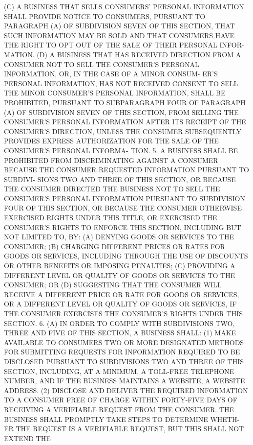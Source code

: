    (C)  A  BUSINESS  THAT  SELLS  CONSUMERS'  PERSONAL  INFORMATION SHALL
 PROVIDE NOTICE TO CONSUMERS, PURSUANT TO PARAGRAPH  (A)  OF  SUBDIVISION
 SEVEN  OF  THIS  SECTION,  THAT  SUCH  INFORMATION  MAY BE SOLD AND THAT
 CONSUMERS HAVE THE RIGHT TO OPT OUT OF THE SALE OF THEIR PERSONAL INFOR-
 MATION.
   (D) A BUSINESS THAT HAS RECEIVED DIRECTION FROM A CONSUMER NOT TO SELL
 THE  CONSUMER'S PERSONAL INFORMATION, OR, IN THE CASE OF A MINOR CONSUM-
 ER'S PERSONAL INFORMATION, HAS NOT RECEIVED CONSENT TO  SELL  THE  MINOR
 CONSUMER'S  PERSONAL  INFORMATION,  SHALL  BE  PROHIBITED,  PURSUANT  TO
 SUBPARAGRAPH FOUR OF PARAGRAPH (A) OF SUBDIVISION SEVEN OF THIS SECTION,
 FROM SELLING THE CONSUMER'S PERSONAL INFORMATION AFTER  ITS  RECEIPT  OF
 THE  CONSUMER'S  DIRECTION,  UNLESS  THE  CONSUMER SUBSEQUENTLY PROVIDES
 EXPRESS AUTHORIZATION FOR THE SALE OF THE CONSUMER'S  PERSONAL  INFORMA-
 TION.
   5.  A  BUSINESS  SHALL  BE  PROHIBITED  FROM  DISCRIMINATING AGAINST A
 CONSUMER BECAUSE THE CONSUMER REQUESTED INFORMATION PURSUANT TO SUBDIVI-
 SIONS TWO AND THREE OF THIS SECTION, OR BECAUSE  THE  CONSUMER  DIRECTED
 THE BUSINESS NOT TO SELL THE CONSUMER'S PERSONAL INFORMATION PURSUANT TO
 SUBDIVISION  FOUR  OF  THIS  SECTION,  OR BECAUSE THE CONSUMER OTHERWISE
 EXERCISED RIGHTS UNDER THIS TITLE, OR EXERCISED THE CONSUMER'S RIGHTS TO
 ENFORCE THIS SECTION, INCLUDING BUT NOT  LIMITED  TO,  BY:  (A)  DENYING
 GOODS  OR  SERVICES  TO  THE  CONSUMER; (B) CHARGING DIFFERENT PRICES OR
 RATES FOR GOODS OR SERVICES, INCLUDING THROUGH THE USE OF  DISCOUNTS  OR
 OTHER BENEFITS OR IMPOSING PENALTIES; (C) PROVIDING A DIFFERENT LEVEL OR
 QUALITY OF GOODS OR SERVICES TO THE CONSUMER; OR (D) SUGGESTING THAT THE
 CONSUMER  WILL  RECEIVE A DIFFERENT PRICE OR RATE FOR GOODS OR SERVICES,
 OR A DIFFERENT LEVEL OR QUALITY OF GOODS OR SERVICES,  IF  THE  CONSUMER
 EXERCISES THE CONSUMER'S RIGHTS UNDER THIS SECTION.
   6.  (A)  IN  ORDER  TO COMPLY WITH SUBDIVISIONS TWO, THREE AND FIVE OF
 THIS SECTION, A BUSINESS SHALL:
   (1) MAKE AVAILABLE TO CONSUMERS TWO OR  MORE  DESIGNATED  METHODS  FOR
 SUBMITTING REQUESTS FOR INFORMATION REQUIRED TO BE DISCLOSED PURSUANT TO
 SUBDIVISIONS  TWO  AND THREE OF THIS SECTION, INCLUDING, AT A MINIMUM, A
 TOLL-FREE TELEPHONE NUMBER, AND IF THE BUSINESS MAINTAINS A  WEBSITE,  A
 WEBSITE ADDRESS.
   (2)  DISCLOSE  AND DELIVER THE REQUIRED INFORMATION TO A CONSUMER FREE
 OF CHARGE WITHIN FORTY-FIVE DAYS OF RECEIVING A VERIFIABLE REQUEST  FROM
 THE CONSUMER. THE BUSINESS SHALL PROMPTLY TAKE STEPS TO DETERMINE WHETH-
 ER  THE  REQUEST  IS A VERIFIABLE REQUEST, BUT THIS SHALL NOT EXTEND THE
